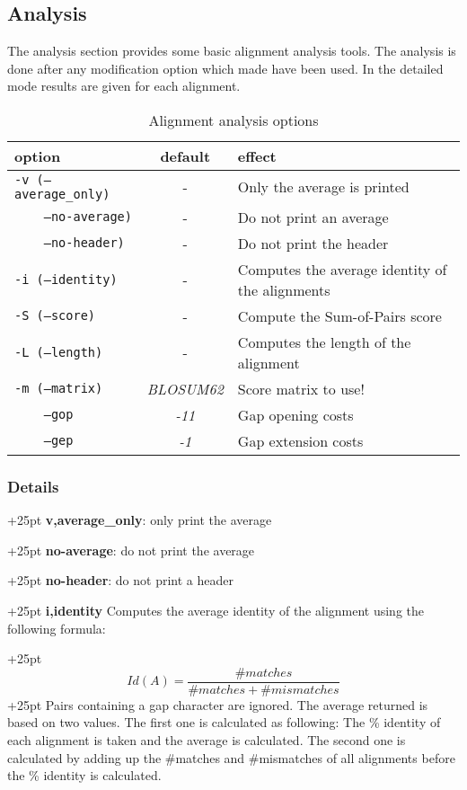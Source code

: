 \documentclass[a4paper,10pt,parskip=half]{scrartcl}
\begin{document}
\subsection{Analysis}\label{ana_opts}
The analysis section provides some basic alignment analysis tools. The analysis is done after any modification option which made have been used. In the detailed mode results are given for each alignment.

\begin{table}[h]
\caption{Alignment analysis options}
\begin{tabular}{lcp{7cm}}\hline
  option& default & effect \\\hline
  \texttt{-v (--average\_only)} &-& Only the average is printed\\
  \texttt{~~~~--no-average)} &-& Do not print an average\\
  \texttt{~~~~--no-header)} &-& Do not print the header\\
  \texttt{-i (--identity)} &-& Computes the average identity of the alignments\\
  \texttt{-S (--score)} &-& Compute the Sum-of-Pairs score\\
  \texttt{-L (--length)} &-& Computes the length of the alignment\\
  \texttt{-m (--matrix)} &\textit{BLOSUM62}& Score matrix to use!\\
  \texttt{~~~~--gop} &\textit{-11} & Gap opening costs\\
  \texttt{~~~~--gep} &\textit{-1}  & Gap extension costs\\
\end{tabular}
\end{table}

 \subsubsection*{Details}
 
\hangindent+25pt 
\textbf{v,average\_only}: only print the average

\hangindent+25pt 
\textbf{no-average}: do not print the average

\hangindent+25pt 
\textbf{no-header}: do not print a header 

\hangindent+25pt 
\textbf{i,identity} Computes the average identity of the alignment using the following formula:

\hangindent+25pt 
\begin{equation*}
 Id(A)=\frac{\#matches}{\#matches+\#mismatches}
\end{equation*}
\hangindent+25pt 
Pairs containing a gap character are ignored. The average returned is based on two values. The first one is calculated as following: The \% identity of each alignment is taken and the average is calculated. The second one is
calculated by adding up the \#matches and \#mismatches of all alignments before the \% identity is calculated.
                             
\end{document}
